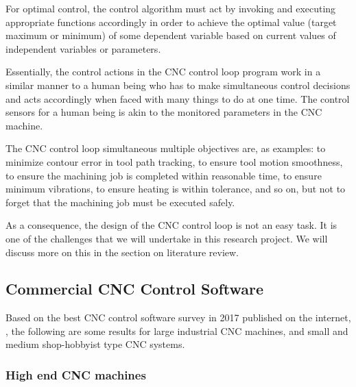 For optimal control, the control algorithm must act by invoking and executing appropriate functions accordingly in order to achieve the optimal value (target maximum or minimum) of some dependent variable based on current values of independent variables or parameters. 
\vspace*{1\baselineskip}

Essentially, the control actions in the CNC control loop program work in a similar manner to a human being who has to make simultaneous control decisions and acts accordingly when faced with many things to do at one time. The control sensors for a human being is akin to the monitored parameters in the CNC machine. 
\vspace*{1\baselineskip}

The CNC control loop simultaneous multiple objectives are, as examples: to minimize contour error in tool path tracking, to ensure tool motion smoothness, to ensure the machining job is completed within reasonable time, to ensure minimum vibrations, to ensure heating is within tolerance, and so on, but not to forget that the machining job must be executed safely.  

\begin{tcolorbox}[colback=green!15!white,colframe=red!75!black,title=Research consideration no. 1]
As a consequence, the design of the CNC control loop is not an easy task. It is one of the challenges that we will undertake in this research project. We will discuss more on this in the section on literature review.
\end{tcolorbox}

\subsection{Commercial CNC Control Software}

Based on the best CNC control software survey in 2017 published on the internet, \cite{Warfield_2017}, the following are some results for large industrial CNC machines, and small and medium shop-hobbyist type CNC systems.

\subsubsection{High end CNC machines}

